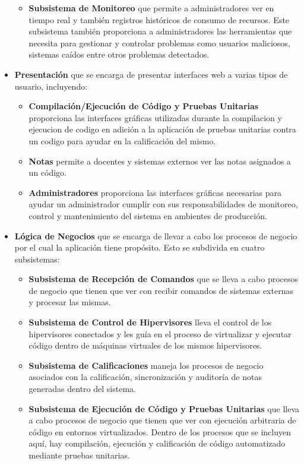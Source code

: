 \begin{itemize}
\begin{itemize}
    	\item \textbf{Subsistema de Monitoreo} que permite a administradores ver en tiempo real y también registros históricos de consumo de recursos. Este subsistema también proporciona a administradores las herramientas que necesita para gestionar y controlar problemas como usuarios maliciosos, sistemas caídos entre otros problemas detectados.
    \end{itemize}
	\item \textbf{Presentación} que se encarga de presentar interfaces web a varias tipos de usuario, incluyendo:
    \begin{itemize}
    	\item \textbf{Compilación/Ejecución de Código y Pruebas Unitarias} proporciona las interfaces gráficas utilizadas durante la compilacion y ejecucion de codigo en adición a la aplicación de pruebas unitarias contra un codigo para ayudar en la calificación del mismo.
        \item \textbf{Notas} permite a docentes y sistemas externos ver las notas asignados a un código.
        \item \textbf{Administradores} proporciona las interfaces gráficas necesarias para ayudar un administrador cumplir con sus responsabilidades de monitoreo, control y mantenimiento del sistema en ambientes de producción.
    \end{itemize}
	\item \textbf{Lógica de Negocios} que se encarga de llevar a cabo los procesos de negocio por el cual la aplicación tiene propósito. Esto se subdivida en cuatro subsistemas:
    \begin{itemize}
    	\item \textbf{Subsistema de Recepción de Comandos} que se lleva a cabo procesos de negocio que tienen que ver con recibir comandos de sistemas externas y procesar las mismas.
        \item \textbf{Subsistema de Control de Hipervisores} lleva el control de los hipervisores conectados y les guía en el proceso de virtualizar y ejecutar código dentro de máquinas virtuales de los mismos hipervisores.
        \item \textbf{Subsistema de Calificaciones} maneja los procesos de negocio asociados con la calificación, sincronización y auditoría de notas generadas dentro del sistema.
        \item \textbf{Subsistema de Ejecución de Código y Pruebas Unitarias} que lleva a cabo procesos de negocio que tienen que ver con ejecución arbitraria de código en entornos virtualizados. Dentro de los procesos que se incluyen aquí, hay compilación, ejecución y calificación de código automatizado mediante pruebas unitarias.

\end{itemize}
\end{itemize}

